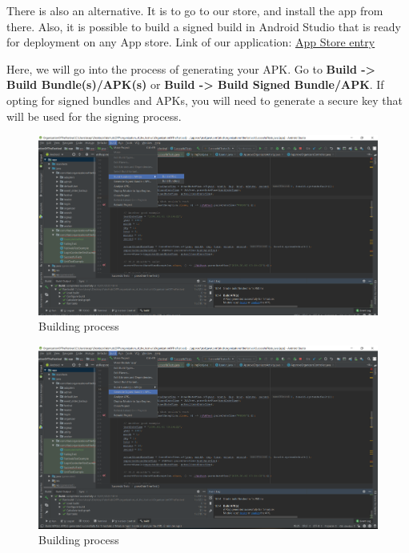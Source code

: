 			There is also an alternative. It is to go to our store, and install the app from there. Also, it is possible to build a signed build in Android Studio that is ready for deployment on any App store. Link of our application: \href{https://play.google.com/store/apps/details?id=com.hfad.organizationofthefestival}{App Store entry}
			
			Here, we will go into the process of generating your APK. Go to \textbf{Build -> Build Bundle(s)/APK(s)} or \textbf{Build -> Build Signed Bundle/APK}. If opting for signed bundles and APKs, you will need to generate a secure key that will be used for the signing process.
			
			\begin{figure}[H]
				\includegraphics[width=\linewidth]{images/Deploy_M_3.png}
				\caption{Building process}
				\label{fig:install_3}
			\end{figure}
			
			\begin{figure}[H]
				\includegraphics[width=\linewidth]{images/Deploy_M_4.png}
				\caption{Building process}
				\label{fig:install_4}
			\end{figure}
			

